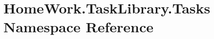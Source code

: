 \hypertarget{namespace_home_work_1_1_task_library_1_1_tasks}{}\section{Home\+Work.\+Task\+Library.\+Tasks Namespace Reference}
\label{namespace_home_work_1_1_task_library_1_1_tasks}
